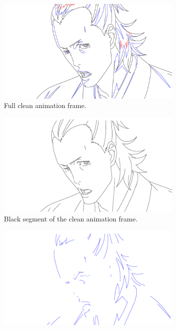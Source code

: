 \begin{figure}
\begin{subfigure}{.5\textwidth}
    \includegraphics[width=\textwidth]{graphics/douga/49.pdf}
    \caption{Full clean animation frame.}
    \label{fig:segment.ex.full}
\end{subfigure}%
\begin{subfigure}{.5\textwidth}
    \includegraphics[width=\textwidth]{graphics/douga/49_black.pdf}
    \caption{Black segment of the clean animation frame.}
\end{subfigure}
\begin{subfigure}{.5\textwidth}
    \includegraphics[width=\textwidth]{graphics/douga/49_blue.pdf}

\end{subfigure}
\end{figure}
